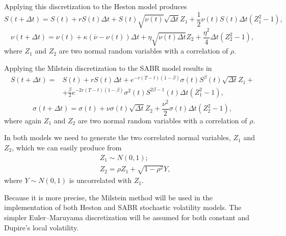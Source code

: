 Applying this discretization to the Heston model produces
\begin{equation}
S(t+\Delta t)=S(t)+rS(t)\Delta t+S(t)\sqrt{\nu(t)}\sqrt{\Delta t}Z_1+\frac{1}{2}\nu(t)S(t)\Delta t(Z_1^2-1),
\end{equation}
\begin{equation}
\nu(t+\Delta t)=\nu(t)+\kappa(\overline{\nu}-\nu(t))\Delta t+\eta\sqrt{\nu(t)\Delta t}Z_2+\frac{\eta^2}{4}\Delta t(Z_2^2-1),
\end{equation}
\noindent where $Z_1$ and $Z_2$ are two normal random variables with a correlation of $\rho$.


Applying the Milstein discretization to the SABR model results in
\begin{equation}
\begin{split}
S(t+\Delta t)=&S(t)+rS(t)\Delta t+e^{-r(T-t)(1-\beta)}\sigma(t)S^\beta(t)\sqrt{\Delta t}Z_1+\\
&+\frac{\beta}{2}e^{-2r(T-t)(1-\beta)}\sigma^2(t)S^{2\beta-1}(t)\Delta t(Z_1^2-1),
\end{split}
\end{equation}
\begin{equation}
\sigma(t+\Delta t)=\sigma(t)+\nu\sigma(t)\sqrt{\Delta t}Z_2+\frac{\nu^2}{2}\sigma(t)\Delta t(Z_2^2-1),
\end{equation}
\noindent where again $Z_1$ and $Z_2$ are two normal random variables with a correlation of $\rho$.

In both models we need to generate the two correlated normal variables, $Z_1$ and $Z_2$, which we can easily produce from
\begin{equation}\label{normcorr}
\begin{split}
&Z_1\sim N(0,1);\\
&Z_2=\rho Z_1+\sqrt{1-\rho^2}Y,
\end{split}
\end{equation}
\noindent where $Y\sim N(0,1)$ is uncorrelated with $Z_1$.

Because it is more precise, the Milstein method will be used in the implementation of both Heston and SABR stochastic volatility models. The simpler Euler–Maruyama discretization will be assumed for both constant and Dupire's local volatility.

